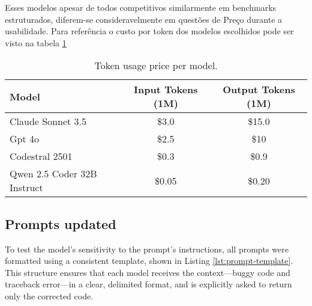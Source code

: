 Esses modelos apesar de todos competitivos similarmente em benchmarks estruturados, diferem-se consideravelmente em questões de Preço durante a usabilidade.
Para referência o custo por token dos modelos escolhidos pode ser visto na tabela \ref{tab:model-tokens}
\begin{table}[h!]
\centering
\caption{Token usage price per model.}
\label{tab:model-tokens}
\begin{tabular}{|l|c|c|}
\hline
\textbf{Model} & \textbf{Input Tokens (1M)} & \textbf{Output Tokens (1M)} \\ \hline
Claude Sonnet 3.5 & \$3.0 & \$15.0 \\ \hline
Gpt 4o & \$2.5 & \$10 \\ \hline
Codestral 2501 & \$0.3 & \$0.9 \\ \hline
Qwen 2.5 Coder 32B Instruct & \$0.05 & \$0.20 \\ \hline
\end{tabular}
\end{table}



\subsection{Prompts updated}

To test the model's sensitivity to the prompt's instructions, all prompts were formatted 
using a consistent template, shown in Listing \ref{lst:prompt-template}. This structure ensures 
that each model receives the context—buggy code and traceback error—in a clear, delimited 
format, and is explicitly asked to return only the corrected code.

